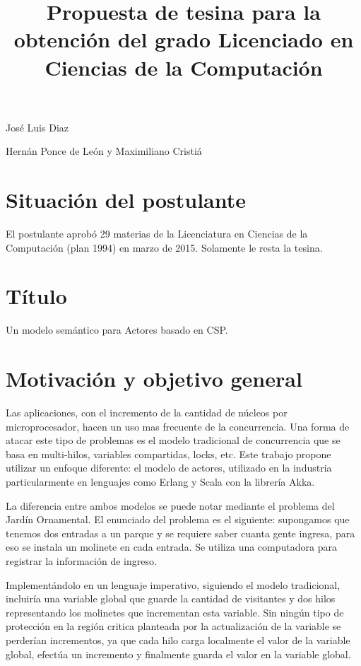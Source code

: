 \documentclass{article}
\begin{document}
\title{Propuesta de tesina para la obtención del grado
Licenciado en Ciencias de la Computación}


\maketitle


 José Luis Diaz

 Hernán Ponce de León y Maximiliano Cristiá

\section{Situación del postulante}
El postulante aprobó 29 materias de la Licenciatura en Ciencias de la Computación (plan 1994) en marzo de 2015. Solamente le resta la tesina.

\section{Título}
Un modelo semántico para Actores basado en CSP.

\section{Motivación y objetivo general}

Las aplicaciones, con el incremento de la cantidad de núcleos por microprocesador, hacen un uso mas frecuente de la concurrencia. Una forma de atacar este tipo de problemas es el modelo tradicional de concurrencia que se basa en multi-hilos, variables compartidas, locks, etc. Este trabajo propone utilizar un enfoque diferente: el modelo de actores, utilizado en la industria particularmente en lenguajes como Erlang\cite{Cesarini:2009:EP:1717841} y Scala\cite{scala-overview-tech-report} con la librería Akka\cite{Wyatt:2013:AC:2663429}. 

La diferencia entre ambos modelos se puede notar mediante el problema del Jardín Ornamental. El enunciado del problema es el siguiente: supongamos que tenemos dos entradas a un parque y se requiere saber cuanta gente ingresa, para eso se instala un molinete en cada entrada. Se utiliza una computadora para registrar la información de ingreso.

Implementándolo en un lenguaje imperativo, siguiendo el modelo tradicional, incluiría una variable global que guarde la cantidad de visitantes y dos hilos representando los molinetes que incrementan esta variable. Sin ningún tipo de protección en la región critica planteada por la actualización de la variable se perderían incrementos, ya que cada hilo carga localmente el valor de la variable global, efectúa un incremento y finalmente guarda el valor en la variable global. 
\end{document}
